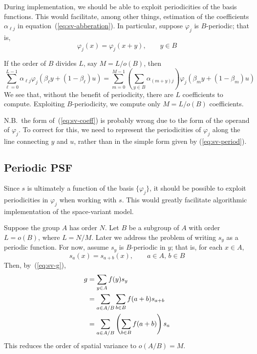\begin{remark}
During implementation, we should be able to exploit periodicities of the basis
functions.  This would facilitate, among other things, estimation of the coefficients
$\alpha_{\ell j}$ in equation~(\ref{eq:sv-abberation}).  In particular,
suppose $\varphi_j$ is $B$-periodic; that is,
\begin{equation}\label{eq:sv-period}
\varphi_j(x) = \varphi_j(x+y), \qquad y \in B
\end{equation}

If the order of $B$ divides $L$, say $M = L/o(B)$, then
\begin{equation}\label{eq:sv-coeff}
\sum_{\ell=0}^{L-1} \alpha_{\ell j} \varphi_j(\beta_{\ell}y +(1-\beta_{\ell})u)
= \sum_{m=0}^{M-1} \left( \sum_{y\in B}\alpha_{(m+y) j}\right) \varphi_j(\beta_m y+(1-\beta_m) u)
\end{equation}
We see that, without the benefit of periodicity, there are $L$ coefficients to compute.
Exploiting $B$-periodicity, we compute only $M = L/o(B)$ coefficients.

N.B.~the form of~(\ref{eq:sv-coeff}) is probably wrong due to the form
of the operand of $\varphi_j$.  To correct for this, we need to represent the
periodicities of $\varphi_j$ along the line connecting $y$ and $u$, rather than
in the simple form given by (\ref{eq:sv-period}).
\end{remark}

\subsection{Periodic PSF}
Since $s$ is ultimately a function of the basis $\{\varphi_j\}$, it should be possible
to exploit periodicities in $\varphi_j$ when working with $s$.
This would greatly facilitate algorithmic implementation
of the space-variant model.  

Suppose the group $A$ has order $N$.  Let $B$ be a subgroup of $A$ with order
$L = o(B)$, where $L = N/M$.  Later we address the problem of writing
$s_y$ as a periodic function.  For now, %
assume $s_y$ is $B$-periodic in $y$; that is, for each $x\in A$,
\[
s_a(x) = s_{a + b}(x), \qquad a \in A, \, b\in B
\]
Then, by~(\ref{eq:sv-g}),
\begin{align*}
g &= \sum_{y \in A}f(y)s_y\\
&= \sum_{a \in A/B}\sum_{b\in B}f(a+b)s_{a+b}\\
&= \sum_{a \in A/B}\left(\sum_{b\in B}f(a+b)\right)s_a
\end{align*}
This reduces the order of spatial variance to $o(A/B) = M$.

